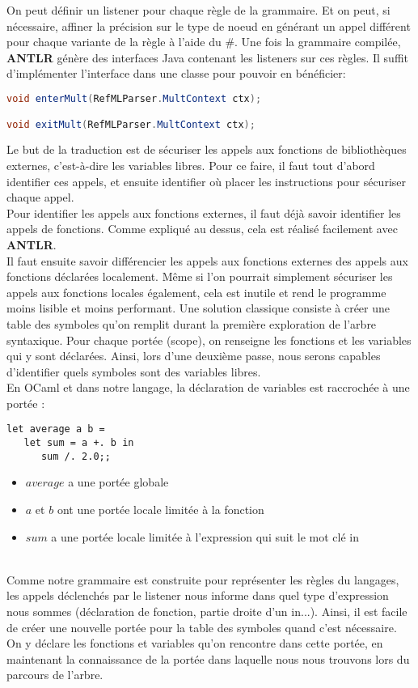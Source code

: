 \documentclass[11pt, a4paper, notitlepage]{article}
\newcommand\tab{{\hspace*{12.5mm}}}
\begin{document}
\tab On peut définir un listener pour chaque règle de la grammaire. Et on peut, si nécessaire, affiner la précision sur le type de noeud en générant un appel différent pour chaque variante de la règle à l'aide du \#. Une fois la grammaire compilée, \textbf{ANTLR} génère des interfaces Java contenant les listeners sur ces règles. Il suffit d'implémenter l'interface dans une classe pour pouvoir en bénéficier:

\begin{lstlisting}[language=java]
void enterMult(RefMLParser.MultContext ctx);

void exitMult(RefMLParser.MultContext ctx);
\end{lstlisting}

\tab Le but de la traduction est de sécuriser les appels aux fonctions de bibliothèques externes, c'est-à-dire les variables libres. Pour ce faire, il faut tout d'abord identifier ces appels, et ensuite identifier où placer les instructions pour sécuriser chaque appel.\\
\tab Pour identifier les appels aux fonctions externes, il faut déjà savoir identifier les appels de fonctions. Comme expliqué au dessus, cela est réalisé facilement avec \textbf{ANTLR}.\\
\tab Il faut ensuite savoir différencier les appels aux fonctions externes des appels aux fonctions déclarées localement. Même si l'on pourrait simplement sécuriser les appels aux fonctions locales également, cela est inutile et rend le programme moins lisible et moins performant. Une solution classique consiste à créer une table des symboles qu'on remplit durant la première exploration de l'arbre syntaxique. Pour chaque portée (scope), on renseigne les fonctions et les variables qui y sont déclarées. Ainsi, lors d'une deuxième passe, nous serons capables d'identifier quels symboles sont des variables libres.\\
\tab En OCaml et dans notre langage, la déclaration de variables est raccrochée à une portée :

\begin{lstlisting}[language=caml]
let average a b =
   let sum = a +. b in
      sum /. 2.0;;
\end{lstlisting}

\begin{itemize}[label=*]
   \item $average$ a une portée globale
   \item $a$ et $b$ ont une portée locale limitée à la fonction
   \item $sum$ a une portée locale limitée à l'expression qui suit le mot clé in
\end{itemize}
\ \\
\tab Comme notre grammaire est construite pour représenter les règles du langages, les appels déclenchés par le listener nous informe dans quel type d'expression nous sommes (déclaration de fonction, partie droite d'un in...). Ainsi, il est facile de créer une nouvelle portée pour la table des symboles quand c'est nécessaire. On y déclare les fonctions et variables qu'on rencontre dans cette portée, en maintenant la connaissance de la portée dans laquelle nous nous trouvons lors du parcours de l'arbre.
\end{document}
